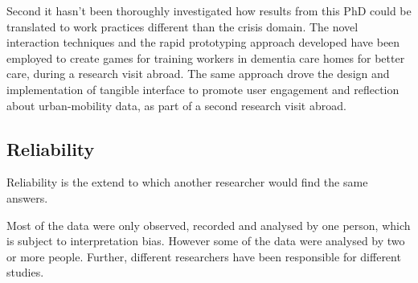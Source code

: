 Second it hasn't been thoroughly investigated how results from this PhD
could be translated to work practices different than the crisis domain.
The novel interaction techniques and the rapid prototyping approach
developed have been employed to create games for training workers in
dementia care homes for better care, during a research visit abroad. The
same approach drove the design and implementation of tangible interface
to promote user engagement and reflection about urban-mobility data, as
part of a second research visit abroad.

\subsection{Reliability}\label{reliability}

Reliability is the extend to which another researcher would find the
same answers.

Most of the data were only observed, recorded and analysed by one
person, which is subject to interpretation bias. However some of the
data were analysed by two or more people. Further, different researchers
have been responsible for different studies.
